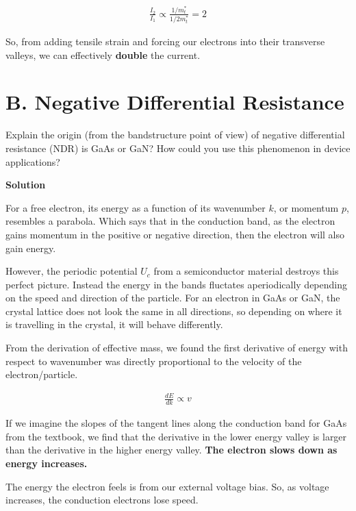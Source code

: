 \documentclass{article}
\begin{document}
\begin{align*}
    \boxed{
        \frac{I_2}{I_1} \propto \frac{1 / m^*_t}{1 / 2m^*_t} = 2
    }
\end{align*}

So, from adding tensile strain and forcing our electrons into their transverse valleys, we can effectively \textbf{double} the current.

\section*{B. Negative Differential Resistance}

Explain the origin (from the bandstructure point of view) of negative differential resistance (NDR) is GaAs or GaN? How could you use this phenomenon in device applications?

\bigskip

\textbf{Solution}

For a free electron, its energy as a function of its wavenumber \(k\), or momentum \(p\), resembles a parabola. Which says that in the conduction band, as the electron gains momentum in the positive or negative direction, then the electron will also gain energy.

\smallskip

However, the periodic potential \(U_c\) from a semiconductor material destroys this perfect picture. Instead the energy in the bands fluctates aperiodically depending on the speed and direction of the particle. For an electron in GaAs or GaN, the crystal lattice does not look the same in all directions, so depending on where it is travelling in the crystal, it will behave differently.

\smallskip

From the derivation of effective mass, we found the first derivative of energy with respect to wavenumber was directly proportional to the velocity of the electron/particle.

\begin{align*}
    \frac{dE}{dk} \propto v
\end{align*}

If we imagine the slopes of the tangent lines along the conduction band for GaAs from the textbook, we find that the derivative in the lower energy valley is larger than the derivative in the higher energy valley. \textbf{The electron slows down as energy increases.}

\smallskip

The energy the electron feels is from our external voltage bias. So, as voltage increases, the conduction electrons lose speed.
\end{document}
